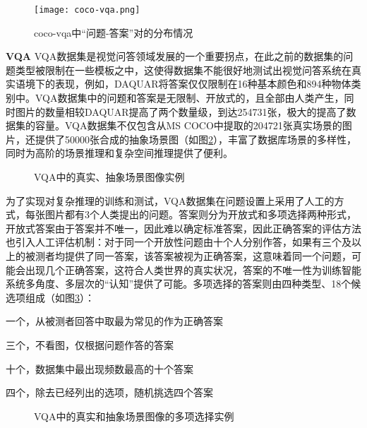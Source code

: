 \begin{figure}[H]
	\centering
	\texttt{[image: coco-vqa.png]}
	\caption{coco-vqa中“问题-答案”对的分布情况}
	\label{coco-vqa}
\end{figure}

\textbf{VQA}
VQA数据集是视觉问答领域发展的一个重要拐点，在此之前的数据集的问题类型被限制在一些模板之中，这使得数据集不能很好地测试出视觉问答系统在真实语境下的表现，例如，DAQUAR将答案仅仅限制在16种基本颜色和894种物体类别中。VQA数据集中的问题和答案是无限制、开放式的，且全部由人类产生，同时图片的数量相较DAQUAR提高了两个数量级，到达254731张，极大的提高了数据集的容量。VQA数据集不仅包含从MS COCO中提取的204721张真实场景的图片，还提供了50000张合成的抽象场景图（如图\ref{vqa-exmaple}），丰富了数据库场景的多样性，同时为高阶的场景推理和复杂空间推理提供了便利。

\begin{figure}[H]
	\centering
	\caption{VQA中的真实、抽象场景图像实例}
	\label{vqa-exmaple}
\end{figure}
为了实现对复杂推理的训练和测试，VQA数据集在问题设置上采用了人工的方式，每张图片都有3个人类提出的问题。答案则分为开放式和多项选择两种形式，开放式答案由于答案并不唯一，因此难以确定标准答案，因此正确答案的评估方法也引入人工评估机制：对于同一个开放性问题由十个人分别作答，如果有三个及以上的被测者均提供了同一答案，该答案被视为正确答案，这意味着同一个问题，可能会出现几个正确答案，这符合人类世界的真实状况，答案的不唯一性为训练智能系统多角度、多层次的“认知”提供了可能。多项选择的答案则由四种类型、18个候选项组成（如图\ref{vqa-multi}）：
\begin{description}[labelindent=2em, leftmargin=6em, style=sameline]  
\item [正确答案] 一个，从被测者回答中取最为常见的作为正确答案
\item [混淆答案] 三个，不看图，仅根据问题作答的答案
\item [常见答案] 十个，数据集中最出现频数最高的十个答案
\item [随机答案] 四个，除去已经列出的选项，随机挑选四个答案
\end{description}
\begin{figure}[H]
	\centering
	\caption{VQA中的真实和抽象场景图像的多项选择实例}
	\label{vqa-multi}
\end{figure}

